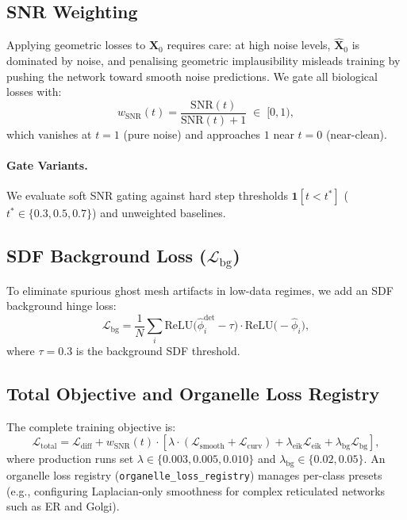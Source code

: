 \documentclass[10pt, a4paper, twocolumn]{article}
\begin{document}
\subsection{SNR Weighting}
\label{sec:snr}

Applying geometric losses to $\hat{\mathbf{X}}_0$ requires care: at high noise levels, $\hat{\mathbf{X}}_0$ is dominated by noise, and penalising geometric implausibility misleads training by pushing the network toward smooth noise predictions. We gate all biological losses with:
\begin{equation}
    w_{\text{SNR}}(t) = \frac{\text{SNR}(t)}{\text{SNR}(t) + 1} \;\in\; [0, 1),
\end{equation}
which vanishes at $t=1$ (pure noise) and approaches $1$ near $t=0$ (near-clean).

\paragraph{Gate Variants.}
We evaluate soft SNR gating against hard step thresholds $\mathbf{1}[t < t^*]$ ($t^* \in \{0.3, 0.5, 0.7\}$) and unweighted baselines.

\subsection{SDF Background Loss ($\mathcal{L}_{\text{bg}}$)}
\label{sec:sdf_bg}

To eliminate spurious ghost mesh artifacts in low-data regimes, we add an SDF background hinge loss:
\begin{equation}
    \mathcal{L}_{\text{bg}} = \frac{1}{N} \sum_{i} \text{ReLU}\bigl(\hat{\phi}_i^{\text{det}} - \tau\bigr) \cdot \text{ReLU}\bigl(-\hat{\phi}_i\bigr),
\end{equation}
where $\tau = 0.3$ is the background SDF threshold.

\subsection{Total Objective and Organelle Loss Registry}

The complete training objective is:
\begin{equation}
    \mathcal{L}_{\text{total}} = \mathcal{L}_{\text{diff}} + w_{\text{SNR}}(t) \cdot \left[ \lambda \cdot (\mathcal{L}_{\text{smooth}} + \mathcal{L}_{\text{curv}}) + \lambda_{\text{eik}} \mathcal{L}_{\text{eik}} + \lambda_{\text{bg}} \mathcal{L}_{\text{bg}} \right],
\end{equation}
where production runs set $\lambda \in \{0.003, 0.005, 0.010\}$ and $\lambda_{\text{bg}} \in \{0.02, 0.05\}$. An organelle loss registry (\texttt{organelle\_loss_registry}) manages per-class presets (e.g., configuring Laplacian-only smoothness for complex reticulated networks such as ER and Golgi).
\end{document}

